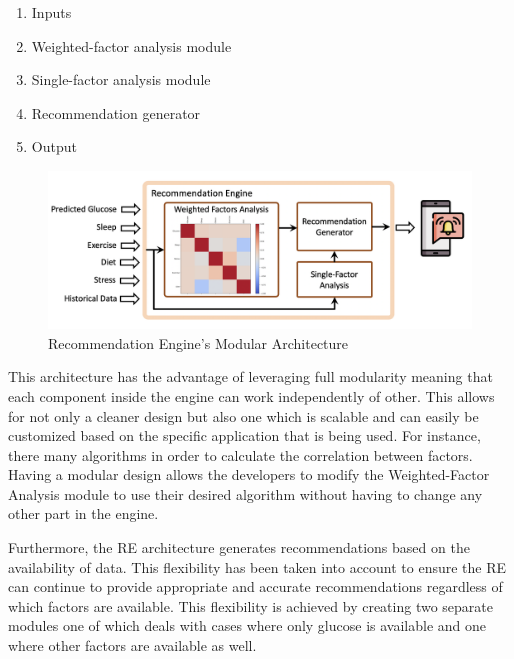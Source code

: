 \begin{enumerate}
    \item Inputs
    \item Weighted-factor analysis module
    \item Single-factor analysis module
    \item Recommendation generator
    \item Output
\end{enumerate}

\begin{figure}[ht!]
    \centering
    \includegraphics[width=\textwidth]{Figures/pooria/re.png}
    \caption{Recommendation Engine's Modular Architecture}
    \label{fig:re}
\end{figure}

This architecture has the advantage of leveraging full modularity meaning that each component inside the engine can work independently of other. This allows for not only a cleaner design but also one which is scalable and can easily be customized based on the specific application that is being used. For instance, there many algorithms in order to calculate the correlation between factors. Having a modular design allows the developers to modify the Weighted-Factor Analysis module to use their desired algorithm without having to change any other part in the engine.

Furthermore, the RE architecture generates recommendations based on the availability of data. This flexibility has been taken into account to ensure the RE can continue to provide appropriate and accurate recommendations regardless of which factors are available. This flexibility is achieved by creating two separate modules one of which deals with cases where only glucose is available and one where other factors are available as well.


